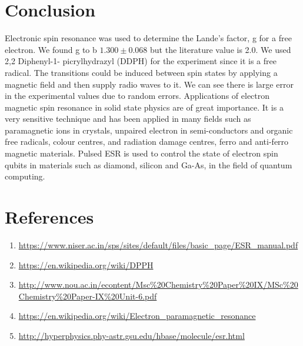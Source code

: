 \documentclass[a4paper, amsfonts, amssymb, amsmath, reprint, showkeys, nofootinbib, twoside]{revtex4-1}
\begin{document}
\section{Conclusion}
Electronic spin resonance was used to determine the Lande's factor, g for a free electron. We found g to b $1.300\pm0.068$ but the literature value is 2.0. We used 2,2 Diphenyl-1- picrylhydrazyl (DDPH) for the experiment since it is a free radical. The transitions could be induced between spin states by applying a magnetic field and then supply radio waves to it. We can see there is large error in the experimental values due to random errors.
Applications of electron magnetic spin resonance in solid state physics are of great importance. It is a very sensitive technique and has been applied in many fields such as paramagnetic ions in crystals, unpaired electron in semi-conductors and organic free radicals, colour centres, and radiation damage centres, ferro and anti-ferro magnetic materials. Pulsed ESR is used to control the state of electron spin qubits in materials such as diamond, silicon and Ga-As, in the field of quantum computing.

\section{References}
\begin{enumerate}
\item{\url{https://www.niser.ac.in/sps/sites/default/files/basic_page/ESR_manual.pdf}}
\item{\url{https://en.wikipedia.org/wiki/DPPH}}
\item{\url{http://www.nou.ac.in/econtent/Msc%20Chemistry%20Paper%20IX/MSc%20Chemistry%20Paper-IX%20Unit-6.pdf}}
\item{\url{https://en.wikipedia.org/wiki/Electron_paramagnetic_resonance}}
\item{\url{http://hyperphysics.phy-astr.gsu.edu/hbase/molecule/esr.html}}
\end{enumerate}
\end{document}
